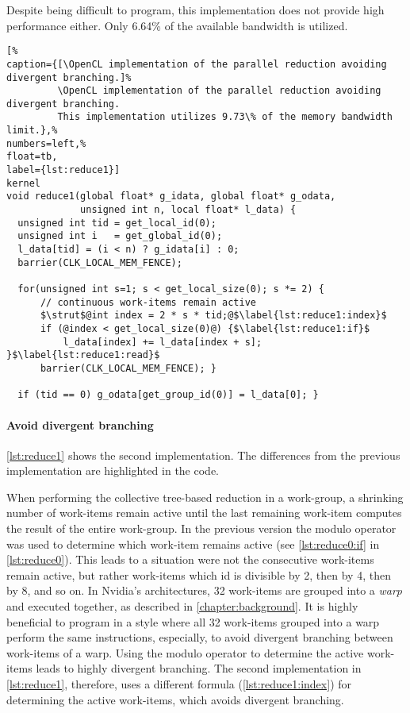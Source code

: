 Despite being difficult to program, this implementation does not provide high performance either.
Only 6.64\% of the available bandwidth is utilized.

\begin{lstlisting}[%
caption={[\OpenCL implementation of the parallel reduction avoiding divergent branching.]%
         \OpenCL implementation of the parallel reduction avoiding divergent branching.
         This implementation utilizes 9.73\% of the memory bandwidth limit.},%
numbers=left,%
float=tb,
label={lst:reduce1}]
kernel
void reduce1(global float* g_idata, global float* g_odata,
             unsigned int n, local float* l_data) {
  unsigned int tid = get_local_id(0);
  unsigned int i   = get_global_id(0);
  l_data[tid] = (i < n) ? g_idata[i] : 0;
  barrier(CLK_LOCAL_MEM_FENCE);

  for(unsigned int s=1; s < get_local_size(0); s *= 2) {
      // continuous work-items remain active
      $\strut$@int index = 2 * s * tid;@$\label{lst:reduce1:index}$
      if (@index < get_local_size(0)@) {$\label{lst:reduce1:if}$
          l_data[index] += l_data[index + s]; }$\label{lst:reduce1:read}$
      barrier(CLK_LOCAL_MEM_FENCE); }

  if (tid == 0) g_odata[get_group_id(0)] = l_data[0]; }
\end{lstlisting}

\paragraph{Avoid divergent branching}

\autoref{lst:reduce1} shows the second implementation.
The differences from the previous implementation are highlighted in the code.

When performing the collective tree-based reduction in a work-group, a shrinking number of work-items remain active until the last remaining work-item computes the result of the entire work-group.
In the previous version the modulo operator was used to determine which work-item remains active (see \autoref{lst:reduce0:if} in \autoref{lst:reduce0}).
This leads to a situation were not the consecutive work-items remain active, but rather work-items which id is divisible by 2, then by 4, then by 8, and so on.
In Nvidia's \GPU architectures, 32 work-items are grouped into a \emph{warp} and executed together, as described in \autoref{chapter:background}.
It is highly beneficial to program in a style where all 32 work-items grouped into a warp perform the same instructions, especially, to avoid divergent branching between work-items of a warp.
Using the modulo operator to determine the active work-items leads to highly divergent branching.
The second implementation in \autoref{lst:reduce1}, therefore, uses a different formula (\autoref{lst:reduce1:index}) for determining the active work-items, which avoids divergent branching.

